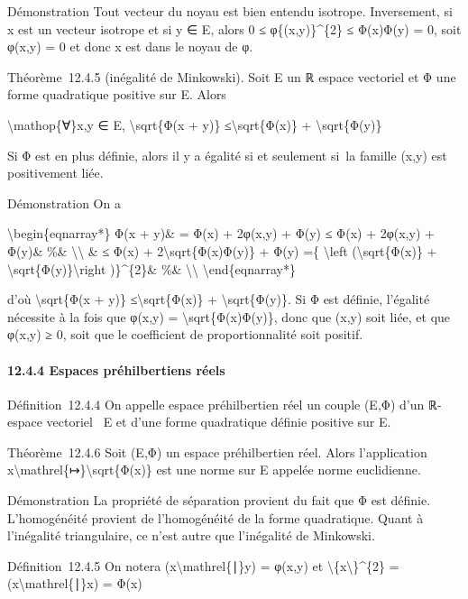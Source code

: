 \documentclass[]{article}
\begin{document}
Démonstration Tout vecteur du noyau est bien entendu isotrope.
Inversement, si x est un vecteur isotrope et si y ∈ E, alors 0 ≤
φ\{(x,y)\}\^{}\{2\} ≤ Φ(x)Φ(y) = 0, soit φ(x,y) = 0 et donc x est dans
le noyau de φ.

Théorème~12.4.5 (inégalité de Minkowski). Soit E un ℝ espace vectoriel
et Φ une forme quadratique positive sur E. Alors

\textbackslash{}mathop\{∀\}x,y ∈ E, \textbackslash{}sqrt\{Φ(x + y)\}
≤\textbackslash{}sqrt\{Φ(x)\} + \textbackslash{}sqrt\{Φ(y)\}

Si Φ est en plus définie, alors il y a égalité si et seulement si~la
famille (x,y) est positivement liée.

Démonstration On a

\textbackslash{}begin\{eqnarray*\} Φ(x + y)\& = Φ(x) + 2φ(x,y) + Φ(y) ≤
Φ(x) + 2\textbar{}φ(x,y)\textbar{} + Φ(y)\& \%\&
\textbackslash{}\textbackslash{} \& ≤ Φ(x) +
2\textbackslash{}sqrt\{Φ(x)Φ(y)\} + Φ(y) =\{ \textbackslash{}left
(\textbackslash{}sqrt\{Φ(x)\} +
\textbackslash{}sqrt\{Φ(y)\}\textbackslash{}right )\}\^{}\{2\}\& \%\&
\textbackslash{}\textbackslash{} \textbackslash{}end\{eqnarray*\}

d'où \textbackslash{}sqrt\{Φ(x + y)\} ≤\textbackslash{}sqrt\{Φ(x)\} +
\textbackslash{}sqrt\{Φ(y)\}. Si Φ est définie, l'égalité nécessite à la
fois que \textbar{}φ(x,y)\textbar{} = \textbackslash{}sqrt\{Φ(x)Φ(y)\},
donc que (x,y) soit liée, et que φ(x,y) ≥ 0, soit que le coefficient de
proportionnalité soit positif.

\paragraph{12.4.4 Espaces préhilbertiens réels}

Définition~12.4.4 On appelle espace préhilbertien réel un couple (E,Φ)
d'un ℝ-espace vectoriel ~E et d'une forme quadratique définie positive
sur E.

Théorème~12.4.6 Soit (E,Φ) un espace préhilbertien réel. Alors
l'application x\textbackslash{}mathrel\{↦\}\textbackslash{}sqrt\{Φ(x)\}
est une norme sur E appelée norme euclidienne.

Démonstration La propriété de séparation provient du fait que Φ est
définie. L'homogénéité provient de l'homogénéité de la forme
quadratique. Quant à l'inégalité triangulaire, ce n'est autre que
l'inégalité de Minkowski.

Définition~12.4.5 On notera (x\textbackslash{}mathrel\{∣\}y) = φ(x,y) et
\textbackslash{}\textbar{}\{x\textbackslash{}\textbar{}\}\^{}\{2\} =
(x\textbackslash{}mathrel\{∣\}x) = Φ(x)
\end{document}
